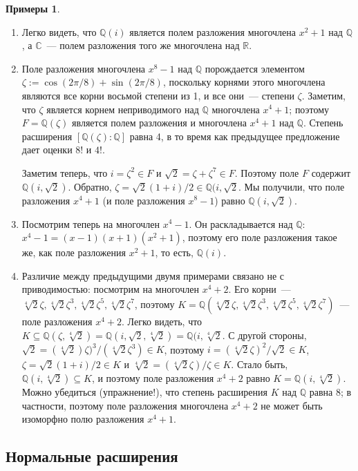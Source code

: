 \documentclass[a4paper,11pt]{scrartcl}
\theoremstyle{plain}
\theoremstyle{definition}
\newtheorem{examples}[theorem]{Примеры}
\newcommand\mb{\mathbb}
\newcommand\sseq{\subseteq}
\begin{document}
\begin{examples}
\begin{enumerate}
\item Легко видеть, что $\mb Q(i)$ является полем разложения
  многочлена $x^2+1$ над $\mb Q$, а $\mb C$~--- полем разложения того
  же многочлена над $\mb R$.
\item Поле разложения многочлена $x^8-1$ над $\mb Q$ порождается
  элементом $\zeta:=\cos(2\pi/8)+\sin(2\pi/8)$, поскольку корнями
  этого многочлена являются все корни восьмой степени из 1, и все
  они~--- степени $\zeta$. Заметим, что $\zeta$ является корнем
  неприводимого над $\mathbb Q$ многочлена $x^4+1$; поэтому
  $F=\mb Q(\zeta)$ является полем разложения и многочлена $x^4+1$ над
  $\mb Q$. Степень расширения $[\mb Q(\zeta):\mb Q]$ равна 4, в то
  время как предыдущее предложение дает оценки $8!$ и $4!$.

Заметим теперь, что $i=\zeta^2\in F$ и $\sqrt{2}=\zeta+\zeta^7\in
F$. Поэтому поле $F$ содержит $\mb Q(i,\sqrt{2})$. Обратно,
$\zeta=\sqrt{2}(1+i)/2\in\mb Q(i,\sqrt{2}$. Мы получили, что поле
разложения $x^4+1$ (и поле разложения $x^8-1$) равно $\mb
Q(i,\sqrt{2})$.
\item Посмотрим теперь на многочлен $x^4-1$. Он раскладывается над
  $\mb Q$: $x^4-1=(x-1)(x+1)(x^2+1)$, поэтому его поле разложения
  такое же, как поле разложения $x^2+1$, то есть, $\mb Q(i)$.
\item Различие между предыдущими двумя примерами связано не с
  приводимостью: посмотрим на многочлен $x^4+2$. Его корни~---
  $\sqrt[4]{2}\zeta, \sqrt[4]{2}\zeta^3,
  \sqrt[4]{2}\zeta^5, \sqrt[4]{2}\zeta^7$, поэтому $K=\mb
  Q(\sqrt[4]{2}\zeta, \sqrt[4]{2}\zeta^3, \sqrt[4]{2}\zeta^5,
  \sqrt[4]{2}\zeta^7)$~--- поле разложения $x^4+2$. Легко видеть, что
  $K\sseq\mb Q(\zeta,\sqrt[4]{2})=\mb Q(i,\sqrt{2},\sqrt[4]{2})=\mb
  Q(i,\sqrt[4]{2}$. С другой стороны,
  $\sqrt{2}=(\sqrt[4]{2})\zeta)^3/(\sqrt[4]{2}\zeta^3)\in K$, поэтому
  $i=(\sqrt[4]{2}\zeta)^2/\sqrt{2}\in K$, $\zeta=\sqrt{2}(1+i)/2\in
  K$ и $\sqrt[4]{2}=(\sqrt[4]{2}\zeta)/\zeta\in K$. Стало быть,
  $\mb Q(i,\sqrt[4]{2})\sseq K$, и поэтому поле разложения $x^4+2$
  равно $K=\mb Q(i,\sqrt[4]{2})$. Можно убедиться (упражнение!), что
  степень расширения $K$ над $\mb Q$ равна 8; в частности, поэтому
  поле разложения многочлена $x^4+2$ не может быть изоморфно полю
  разложения $x^4+1$.
\end{enumerate}
\end{examples}

\subsection{Нормальные расширения}
\end{document}
